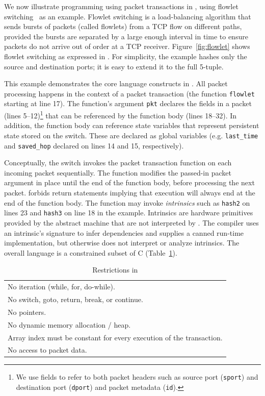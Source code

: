 We now illustrate programming using packet transactions in \pktlanguage, using
flowlet switching~\cite{flowlets} as an example. Flowlet switching is a
load-balancing algorithm that sends bursts of packets (called flowlets) from a
TCP flow on different paths, provided the bursts are separated by a large
enough interval in time to ensure packets do not arrive out of order at a TCP
receiver. Figure~\ref{fig:flowlet} shows flowlet switching as expressed in
\pktlanguage. For simplicity, the example hashes only the source and
destination ports; it is easy to extend it to the full 5-tuple.

This example demonstrates the core language constructs in \pktlanguage. All
packet processing happens in the context of a packet transaction (the function
\texttt{flowlet} starting at line 17). The function's argument {\tt pkt} declares the
fields in a packet (lines 5--12)\footnote{We use fields to refer to both packet
headers such as source port ({\tt sport}) and destination port ({\tt dport})
and packet metadata ({\tt id}).} that can be referenced by the function body
(lines 18--32).  In addition, the function body can reference state variables
that represent persistent state stored on the switch. These are declared as
global variables (e.g. \texttt{last\_time} and \texttt{saved\_hop} declared on
lines 14 and 15, respectively).

Conceptually, the switch invokes the packet transaction function on each
incoming packet sequentially. The function modifies the passed-in packet
argument in place until the end of the function body, before processing the
next packet.  \pktlanguage forbids return statements implying that execution
will always end at the end of the function body. The function may invoke
\textit{intrinsics} such as \texttt{hash2} on lines 23 and \texttt{hash3} on
line 18 in the example.  Intrinsics are hardware primitives provided by the
abstract machine that are not interpreted by \pktlanguage. The \pktlanguage
compiler uses an intrinsic's signature to infer dependencies and supplies a
canned run-time implementation, but otherwise does not interpret or analyze
intrinsics. The overall language is a constrained subset of C (Table~\ref{tab:restrict}).
\begin{table}
  \begin{tabular}{p{}}
    No iteration (while, for, do-while).\\
    No switch, goto, return, break, or continue.\\
    No pointers.\\
    No dynamic memory allocation / heap.\\
    Array index must be constant for every execution of the transaction.\\
    No access to packet data.\\
  \end{tabular}
  \caption{Restrictions in \pktlanguage}
  \label{tab:restrict}
\end{table}

